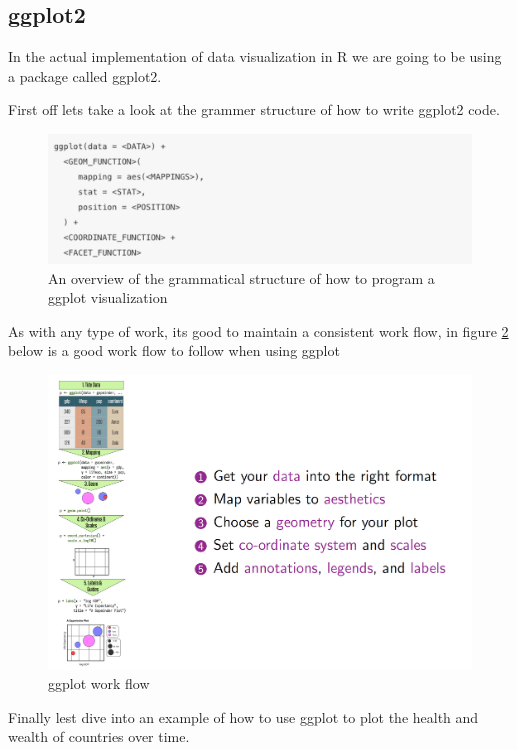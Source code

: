 \subsection{ggplot2}
\begin{flushleft}
In the actual implementation of data visualization in R we are going to be using a package called ggplot2. 
\end{flushleft}
\begin{flushleft}
First off lets take a look at the grammer structure of how to write ggplot2 code.
\end{flushleft}
\begin{figure}[h]
    \centering
    \includegraphics[width=.75\textwidth]{figures/ggplot2_grammar.png}
    \caption{An overview of the grammatical structure of how to program a ggplot visualization}
    \label{fig:ggplot2_grammar}
\end{figure}
\begin{flushleft}
As with any type of work, its good to maintain a consistent work flow, in figure \ref{fig:ggplot_workflow} below is a good work flow to follow when using ggplot 
\end{flushleft}
\begin{figure}[h]
    \centering
    \includegraphics[width=.75\textwidth]{figures/ggplot_workflow.png}
    \caption{ggplot work flow}
    \label{fig:ggplot_workflow}
\end{figure}
\begin{flushleft}
Finally lest dive into an example of how to use ggplot to plot the health and wealth of countries over time. 
\end{flushleft}
